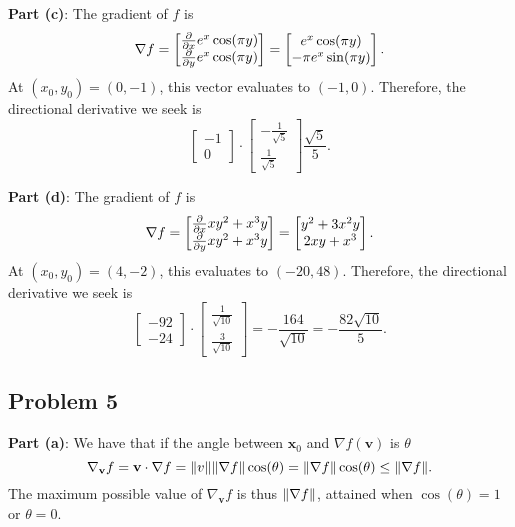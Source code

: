 \documentclass[11pt]{article}
\renewcommand{\vec}[1]{\mathbf{#1}}
\renewcommand{\grad}{\nabla}
\begin{document}
\textbf{Part (c)}: The gradient of $f$ is 
\[
	\grad f = \begin{bmatrix} \pdv{x} e^{x} \cos(\pi y) \\ \pdv{y} e^{x} \cos(\pi y) \end{bmatrix} = \begin{bmatrix} e^{x} \cos(\pi y) \\ - \pi e^{x} \sin(\pi y) \end{bmatrix}.
\]
At $(x_{0}, y_{0}) = (0, -1)$, this vector evaluates to $(-1, 0)$. Therefore, the directional derivative we seek is 
\[
	\begin{bmatrix} -1 \\ 0 \end{bmatrix} \cdot \begin{bmatrix} -\frac{1}{\sqrt{5}} \\ \frac{1}{\sqrt{5}} \end{bmatrix} \boxed{\frac{\sqrt{5}}{5}}.
\]

\textbf{Part (d)}: The gradient of $f$ is
\[
	\grad f = \begin{bmatrix} \pdv{x} xy^{2} + x^{3}y \\ \pdv{y} xy^{2} + x^{3}y \end{bmatrix} = \begin{bmatrix} y^{2} + 3x^{2}y \\ 2xy + x^{3} \end{bmatrix}.
\]
At $(x_{0}, y_{0}) = (4, -2)$, this evaluates to $(-20, 48)$. Therefore, the directional derivative we seek is
\[
	\begin{bmatrix} -92 \\ -24 \end{bmatrix} \cdot \begin{bmatrix} \frac{1}{\sqrt{10}} \\ \frac{3}{\sqrt{10}} \end{bmatrix} = -\frac{164}{\sqrt{10}} = \boxed{-\frac{82\sqrt{10}}{5}}.
\]

\subsection{Problem 5}

\textbf{Part (a)}: We have that if the angle between $\vec{x}_{0}$ and $\grad f (\vec{v})$ is $\theta$
\[
	\grad_{\vec{v}} f = \vec{v} \cdot \grad f = \norm{v} \norm{\grad f} \cos(\theta) = \norm{\grad f} \cos(\theta) \le \norm{\grad f}.
\]
The maximum possible value of $\grad_{\vec{v}} f$ is thus $\norm{\grad f}$, attained when $\cos(\theta) = 1$ or $\theta = 0$.
\end{document}
